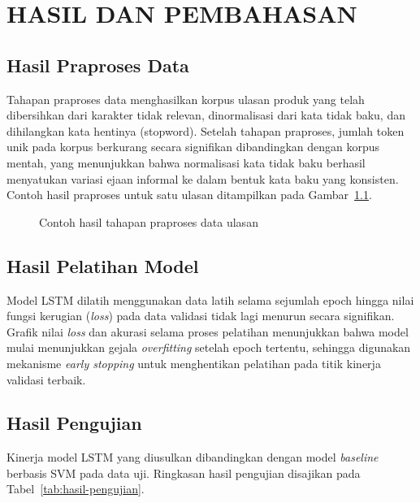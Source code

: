
\chapter{HASIL DAN PEMBAHASAN}

\section{Hasil Praproses Data}
Tahapan praproses data menghasilkan korpus ulasan produk yang telah
dibersihkan dari karakter tidak relevan, dinormalisasi dari kata
tidak baku, dan dihilangkan kata hentinya (stopword). Setelah tahapan
praproses, jumlah token unik pada korpus berkurang secara signifikan
dibandingkan dengan korpus mentah, yang menunjukkan bahwa normalisasi
kata tidak baku berhasil menyatukan variasi ejaan informal ke dalam
bentuk kata baku yang konsisten. Contoh hasil praproses untuk satu
ulasan ditampilkan pada Gambar~\ref{fig:praproses}.

\begin{figure}[htbp]
  \centering
  \caption{Contoh hasil tahapan praproses data ulasan}
  \label{fig:praproses}
\end{figure}

\section{Hasil Pelatihan Model}
Model LSTM dilatih menggunakan data latih selama sejumlah epoch
hingga nilai fungsi kerugian (\textit{loss}) pada data validasi tidak
lagi menurun secara signifikan. Grafik nilai \textit{loss} dan
akurasi selama proses pelatihan menunjukkan bahwa model mulai
menunjukkan gejala \textit{overfitting} setelah epoch tertentu,
sehingga digunakan mekanisme \textit{early stopping} untuk menghentikan
pelatihan pada titik kinerja validasi terbaik.

\section{Hasil Pengujian}
Kinerja model LSTM yang diusulkan dibandingkan dengan model
\textit{baseline} berbasis SVM pada data uji. Ringkasan hasil
pengujian disajikan pada Tabel~\ref{tab:hasil-pengujian}.

